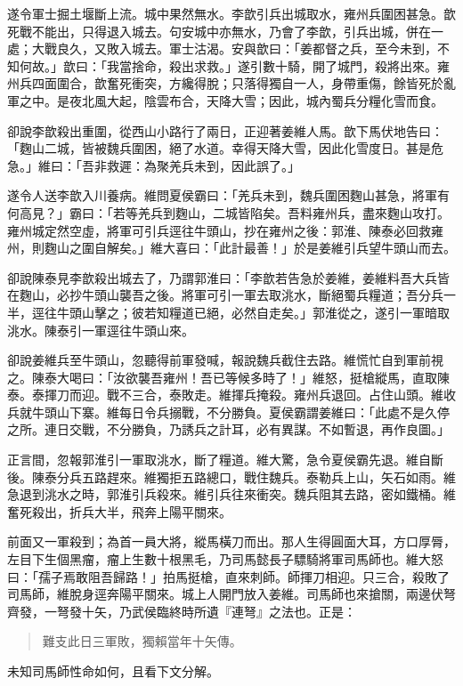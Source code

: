 遂令軍士掘土堰斷上流。城中果然無水。李歆引兵出城取水，雍州兵圍困甚急。歆死戰不能出，只得退入城去。句安城中亦無水，乃會了李歆，引兵出城，併在一處；大戰良久，又敗入城去。軍士沽渴。安與歆曰：「姜都督之兵，至今未到，不知何故。」歆曰：「我當捨命，殺出求救。」遂引數十騎，開了城門，殺將出來。雍州兵四面圍合，歆奮死衝突，方纔得脫；只落得獨自一人，身帶重傷，餘皆死於亂軍之中。是夜北風大起，陰雲布合，天降大雪；因此，城內蜀兵分糧化雪而食。

卻說李歆殺出重圍，從西山小路行了兩日，正迎著姜維人馬。歆下馬伏地告曰：「麴山二城，皆被魏兵圍困，絕了水道。幸得天降大雪，因此化雪度日。甚是危急。」維曰：「吾非救遲：為聚羌兵未到，因此誤了。」

遂令人送李歆入川養病。維問夏侯霸曰：「羌兵未到，魏兵圍困麴山甚急，將軍有何高見？」霸曰：「若等羌兵到麴山，二城皆陷矣。吾料雍州兵，盡來麴山攻打。雍州城定然空虛，將軍可引兵逕往牛頭山，抄在雍州之後：郭淮、陳泰必回救雍州，則麴山之圍自解矣。」維大喜曰：「此計最善！」於是姜維引兵望牛頭山而去。

卻說陳泰見李歆殺出城去了，乃謂郭淮曰：「李歆若告急於姜維，姜維料吾大兵皆在麴山，必抄牛頭山襲吾之後。將軍可引一軍去取洮水，斷絕蜀兵糧道；吾分兵一半，逕往牛頭山擊之；彼若知糧道已絕，必然自走矣。」郭淮從之，遂引一軍暗取洮水。陳泰引一軍逕往牛頭山來。

卻說姜維兵至牛頭山，忽聽得前軍發喊，報說魏兵截住去路。維慌忙自到軍前視之。陳泰大喝曰：「汝欲襲吾雍州！吾已等候多時了！」維怒，挺槍縱馬，直取陳泰。泰揮刀而迎。戰不三合，泰敗走。維揮兵掩殺。雍州兵退回。占住山頭。維收兵就牛頭山下寨。維每日令兵搦戰，不分勝負。夏侯霸謂姜維曰：「此處不是久停之所。連日交戰，不分勝負，乃誘兵之計耳，必有異謀。不如暫退，再作良圖。」

正言間，忽報郭淮引一軍取洮水，斷了糧道。維大驚，急令夏侯霸先退。維自斷後。陳泰分兵五路趕來。維獨拒五路總口，戰住魏兵。泰勒兵上山，矢石如雨。維急退到洮水之時，郭淮引兵殺來。維引兵往來衝突。魏兵阻其去路，密如鐵桶。維奮死殺出，折兵大半，飛奔上陽平關來。

前面又一軍殺到；為首一員大將，縱馬橫刀而出。那人生得圓面大耳，方口厚脣，左目下生個黑瘤，瘤上生數十根黑毛，乃司馬懿長子驃騎將軍司馬師也。維大怒曰：「孺子焉敢阻吾歸路！」拍馬挺槍，直來刺師。師揮刀相迎。只三合，殺敗了司馬師，維脫身逕奔陽平關來。城上人開門放入姜維。司馬師也來搶關，兩邊伏弩齊發，一弩發十矢，乃武侯臨終時所遺『連弩』之法也。正是：

\begin{quote}
難支此日三軍敗，獨賴當年十矢傳。
\end{quote}

未知司馬師性命如何，且看下文分解。
